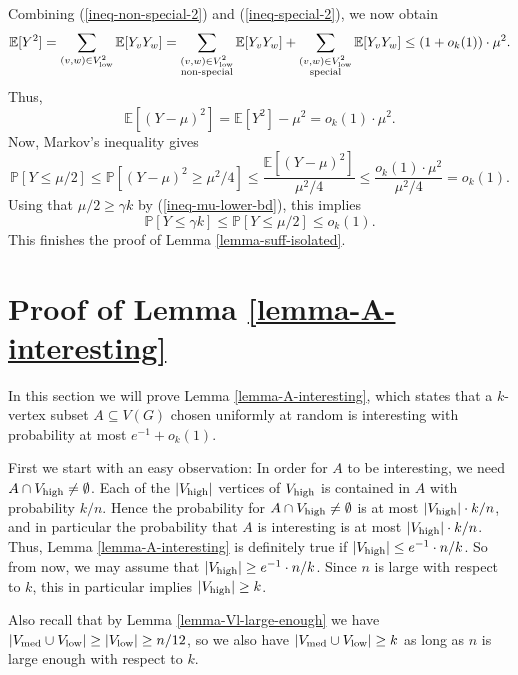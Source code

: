 Combining (\ref{ineq-non-special-2}) and (\ref{ineq-special-2}), we now obtain
\[\mathbb{E}[Y^2]=\sum_{(v,w)\in V_{\textnormal{low}}^2}\mathbb{E}[Y_vY_w]=\sum_{\substack{(v,w)\in V_{\textnormal{low}}^2\\\text{non-special}}}\mathbb{E}[Y_vY_w]+\sum_{\substack{(v,w)\in V_{\textnormal{low}}^2\\\text{special}}}\mathbb{E}[Y_vY_w]\leq (1+o_k(1))\cdot\mu^2.\]
Thus,
\[\mathbb{E}[(Y-\mu)^2]=\mathbb{E}[Y^2]-\mu^2=o_k(1)\cdot \mu^2.\]
Now, Markov's inequality gives
\[\mathbb{P}[Y\leq \mu/2]\leq \mathbb{P}[(Y-\mu)^2\geq \mu^2/4]\leq \frac{\mathbb{E}[(Y-\mu)^2]}{\mu^2/4}\leq \frac{o_k(1)\cdot \mu^2}{\mu^2/4}=o_k(1).\]
Using that $\mu/2\geq \gamma k$ by (\ref{ineq-mu-lower-bd}), this implies
\[\mathbb{P}[Y\leq \gamma k]\leq \mathbb{P}[Y\leq \mu/2]\leq o_k(1).\]
This finishes the proof of Lemma \ref{lemma-suff-isolated}.

\section{Proof of Lemma \ref{lemma-A-interesting}}\label{sect-A-interesting}

In this section we will prove Lemma \ref{lemma-A-interesting}, which states that a $k$-vertex subset $A\subseteq V(G)$ chosen uniformly at random is interesting with probability at most $e^{-1}+o_k(1)$.

First we start with an easy observation: In order for $A$ to be interesting, we need $A\cap V_{\textnormal{high}}\neq \emptyset$. Each of the $\vert V_{\textnormal{high}}\vert$ vertices of $V_{\textnormal{high}}$ is contained in $A$ with probability $k/n$. Hence the probability for $A\cap V_{\textnormal{high}}\neq \emptyset$ is at most $\vert V_{\textnormal{high}}\vert\cdot k/n$, and in particular the probability that $A$ is interesting is at most $\vert V_{\textnormal{high}}\vert\cdot k/n$. Thus, Lemma \ref{lemma-A-interesting} is definitely true if $\vert V_{\textnormal{high}}\vert\leq e^{-1}\cdot n/k$. So from now, we may assume that $\vert V_{\textnormal{high}}\vert\geq e^{-1}\cdot n/k$. Since $n$ is large with respect to $k$, this in particular implies $\vert V_{\textnormal{high}}\vert \geq k$.

Also recall that by Lemma \ref{lemma-Vl-large-enough} we have $\vert V_{\textnormal{med}}\cup V_{\textnormal{low}}\vert\geq \vert V_{\textnormal{low}}\vert\geq n/12$, so we also have $\vert V_{\textnormal{med}}\cup V_{\textnormal{low}}\vert\geq k$ as long as $n$ is large enough with respect to $k$.

